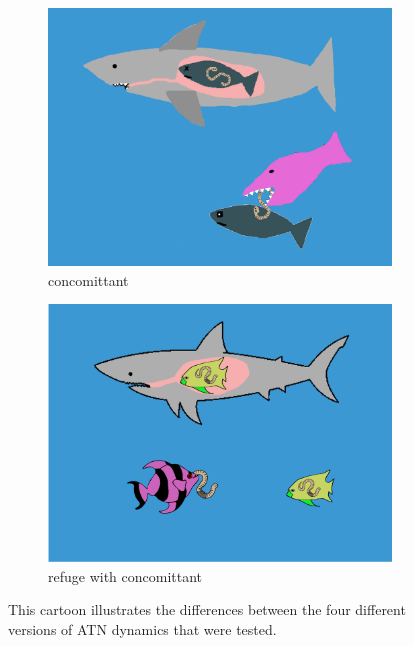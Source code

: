\documentclass[11pt]{amsart}
\begin{document}
\begin{figure}
\begin{subfigure}{.45\textwidth}
\caption{concomittant\label{subfig:modelsc}}
\includegraphics[width=\textwidth]{../figures/Null+Con.png}
\end{subfigure}
\begin{subfigure}{.45\textwidth}
\caption{refuge with concomittant\label{subfig:modelsd}}
\includegraphics[width=\textwidth]{../figures/Con+Ref.png}
\end{subfigure}
\caption{This cartoon illustrates the differences between the four different versions of ATN dynamics that were tested.  \label{fig:cartoons}}
\end{figure}
\end{document}

